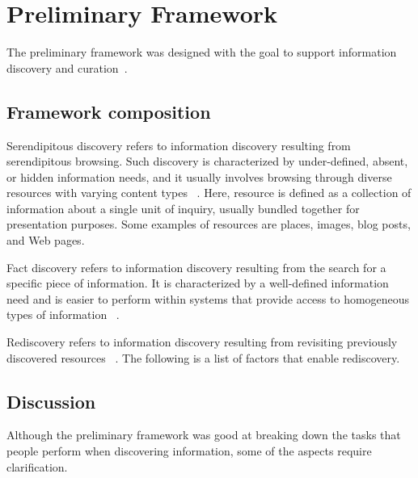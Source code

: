 \chapter{Preliminary Framework}
\label{chapter:old_framework}
The preliminary framework was designed with the goal to support information discovery and curation~\cite{voyloshnikova2014}.

{\section{Framework composition}



Serendipitous discovery refers to information discovery resulting from serendipitous browsing. Such discovery is characterized by under-defined, absent, or hidden information needs, and it usually involves browsing through diverse resources with varying content types ~\cite{kellar2006, kellar2007}. Here, resource is defined as a collection of information about a single unit of inquiry, usually bundled together for presentation purposes. Some examples of resources are places, images, blog posts, and Web pages.

Fact discovery refers to information discovery resulting from the search for a specific piece of information. It is characterized by a well-defined information need and is easier to perform within systems that provide access to homogeneous types of information ~\cite{kellar2006, lindley}.

Rediscovery refers to information discovery resulting from revisiting previously discovered resources ~\cite{tauscher}. The following is a list of factors that enable rediscovery.

} %
{\section{Discussion}
Although the preliminary framework was good at breaking down the tasks that people perform when discovering information, some of the aspects require clarification. 
} %


